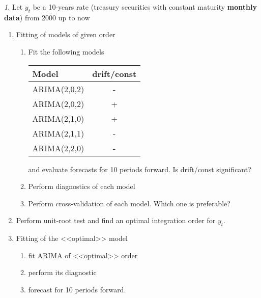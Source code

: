 \documentclass[12pt]{article}
\theoremstyle{remark}
\newtheorem{exercise}{}[section]
\begin{document}
\begin{exercise}
Let \(y_t\) be a 10-years rate (treasury securities  with constant maturity  \textbf{monthly data}) from 2000 up to now
	\begin{enumerate}
		\item Fitting of models of given order
		\begin{enumerate}
			\item Fit the following models
			\begin{center}\small
				\begin{tabular}{l|c}
					Model & drift/const \\ \hline
					ARIMA(2,0,2) & - \\
					ARIMA(2,0,2) & + \\
					ARIMA(2,1,0) & + \\
					ARIMA(2,1,1) & - \\
					ARIMA(2,2,0) & - \\ \hline
				\end{tabular}
			\end{center} 
			and evaluate forecasts for 10 periods forward. Is drift/const significant?
			\item Perform diagnostics of each model
			\item Perform cross-validation of each model. Which one is preferable?
		\end{enumerate}
		\item Perform unit-root test and find an optimal integration order for  \(y_t\). 
		\item Fitting of the <<optimal>> model
		\begin{enumerate}
			\item fit ARIMA of <<optimal>> order
			\item perform its diagnostic
			\item forecast for 10 periods forward.
		\end{enumerate}
	\end{enumerate}
\end{exercise}
\end{document}
